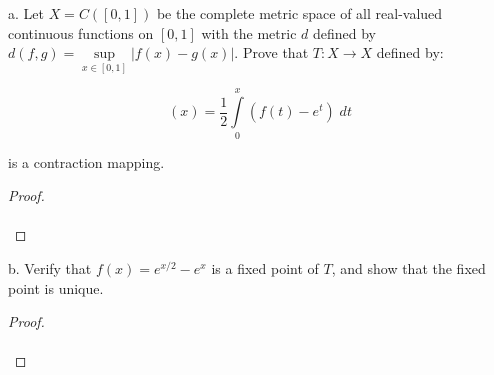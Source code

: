 a.  Let $X = C([0, 1])$ be the complete metric space of all real-valued continuous functions on $[0, 1]$ with the metric
    $d$ defined by $d(f, g) = \sup\limits_{x \in [0, 1]}{|f(x) - g(x)|}$. Prove that $T: X \to X$ defined by:

    \begin{equation*}
        [T(f)](x) = \frac{1}{2} \int\limits_0^x{(f(t) - e^t) \; dt}
    \end{equation*}

    is a contraction mapping.

\begin{proof}\renewcommand{\qedsymbol}{}\ \\\\
\end{proof}

\pagebreak


b.  Verify that $f(x) = e^{x/2} - e^x$ is a fixed point of $T$, and show that the fixed point is unique.

\begin{proof}\renewcommand{\qedsymbol}{}\ \\\\
\end{proof}
